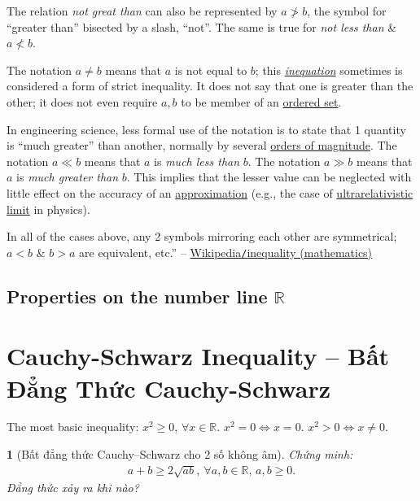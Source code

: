 \documentclass{article}
\newtheorem{baitoan}{}
\begin{document}
The relation \textit{not great than} can also be represented by $a\not > b$, the symbol for ``greater than'' bisected by a slash, ``not''. The same is true for \textit{not less than} \& $a\not < b$.

The notation $a\ne b$ means that $a$ is not equal to $b$; this \href{https://en.wikipedia.org/wiki/Inequation}{\textit{inequation}} sometimes is considered a form of strict inequality. It does not say that one is greater than the other; it does not even require $a,b$  to be member of an \href{https://en.wikipedia.org/wiki/Ordered_set}{ordered set}.

In engineering science, less formal use of the notation is to state that 1 quantity is ``much greater'' than another, normally by several \href{https://en.wikipedia.org/wiki/Order_of_magnitude}{orders of magnitude}. The notation $a\ll b$ means that $a$ is \textit{much less than} $b$. The notation $a\gg b$ means that $a$ is \textit{much greater than} $b$. This implies that the lesser value can be neglected with little effect on the accuracy of an \href{https://en.wikipedia.org/wiki/Approximation}{approximation} (e.g., the case of \href{https://en.wikipedia.org/wiki/Ultrarelativistic_limit}{ultrarelativistic limit} in physics).

In all of the cases above, any 2 symbols mirroring each other are symmetrical; $a < b$ \& $b > a$ are equivalent, etc.'' -- \href{https://en.wikipedia.org/wiki/Inequality_(mathematics)}{Wikipedia\texttt{/}inequality (mathematics)}

\subsection{Properties on the number line $\mathbb{R}$}



\section{Cauchy-Schwarz Inequality -- Bất Đẳng Thức Cauchy-Schwarz}
The most basic inequality: $x^2\ge0$, $\forall x\in\mathbb{R}$. $x^2 = 0\Leftrightarrow x = 0$. $x^2 > 0\Leftrightarrow x\ne0$.

\begin{baitoan}[Bất đẳng thức Cauchy--Schwarz cho 2 số không âm]
	Chứng minh:
	\begin{align*}
		\boxed{a + b\ge2\sqrt{ab},\ \forall a,b\in\mathbb{R},\,a,b\ge 0.}
	\end{align*}
	Đẳng thức xảy ra khi nào?
\end{baitoan}
\end{document}
